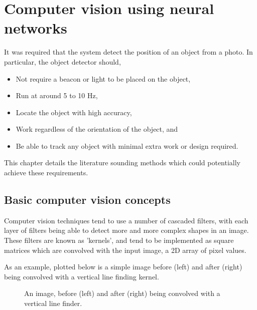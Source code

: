 \section{Computer vision using neural networks}
It was required that the system detect the position of an object from a photo. In particular, the object detector should,

\begin{itemize}
	\item Not require a beacon or light to be placed on the object,
	\item Run at around 5 to 10 Hz,
	\item Locate the object with high accuracy,
	\item Work regardless of the orientation of the object, and
	\item Be able to track any object with minimal extra work or design required.
\end{itemize}

This chapter details the literature sounding methods which could potentially achieve these requirements.

\subsection{Basic computer vision concepts}
Computer vision techniques tend to use a number of cascaded filters, with each layer of filters being able to detect more and more complex shapes in an image. These filters are known as 'kernels', and tend to be implemented as square matrices which are convolved with the input image, a 2D array of pixel values.

As an example, plotted below is a simple image before (left) and after (right) being convolved with a vertical line finding kernel.

\begin{figure}[h!]%
    \centering
    \qquad \qquad
    \caption{An image, before (left) and after (right) being convolved with a vertical line finder.}%
    \label{fig:example}%
\end{figure}

